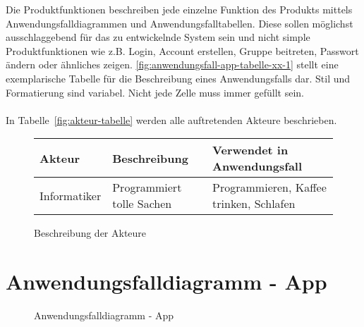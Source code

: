 \begin{tcolorbox}
Die Produktfunktionen beschreiben jede einzelne Funktion des Produkts mittels Anwendungsfalldiagrammen und Anwendungsfalltabellen.
Diese sollen möglichst ausschlaggebend für das zu entwickelnde System sein und nicht simple Produktfunktionen wie z.B. Login, Account erstellen, Gruppe beitreten, Passwort ändern oder ähnliches zeigen.
\autoref{fig:anwendungsfall-app-tabelle-xx-1} stellt eine exemplarische Tabelle für die Beschreibung eines Anwendungsfalls dar. Stil und Formatierung sind variabel. Nicht jede Zelle muss immer gefüllt sein.
\\\\
In  Tabelle~\autoref{fig:akteur-tabelle} werden alle auftretenden Akteure beschrieben.


\end{tcolorbox}

\begin{figure}[h]
	\centering
	
	\begin{tabularx}{\textwidth}{ p{} | p{} | X }
		\textbf{Akteur} & \textbf{Beschreibung} & \textbf{Verwendet in Anwendungsfall} \\ \hline
		Informatiker & Programmiert tolle Sachen & Programmieren, Kaffee trinken, Schlafen
	\end{tabularx}
	
	\caption{Beschreibung der Akteure}
	\label{fig:akteur-tabelle}
\end{figure}



\section{Anwendungsfalldiagramm - App}

\begin{figure}[h]
	\centering
	\caption{Anwendungsfalldiagramm - App}
	\label{fig:anwendungsfalldiagramm-app}
\end{figure}

\newpage

